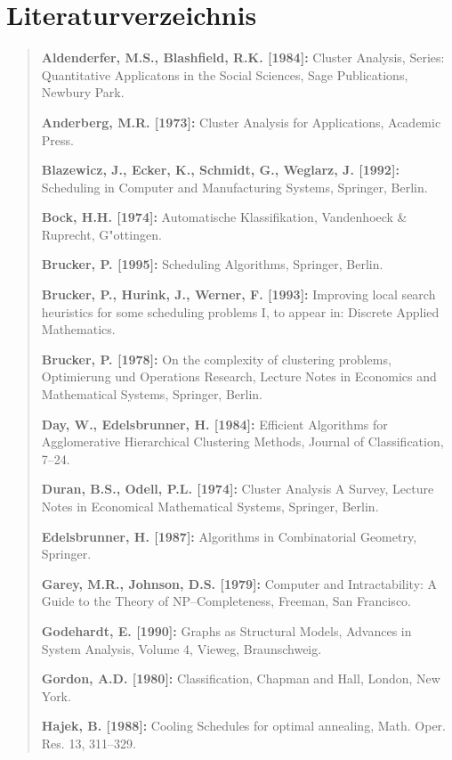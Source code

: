 \chapter*{Literaturverzeichnis}

\begin{sloppy}
\begin{verse}
{\bf Aldenderfer, M.S., Blashfield, R.K. [1984]:} Cluster Analysis,
	Series: Quantitative Applicatons in the Social Sciences, 
	Sage Publications, Newbury Park.

{\bf Anderberg, M.R. [1973]:} Cluster Analysis for Applications, 
	Academic Press.

{\bf Blazewicz, J., Ecker, K., Schmidt, G., Weglarz, J. [1992]:}
	Sche\-du\-ling in Computer and Manufacturing Systems, Springer, Berlin.

{\bf Bock, H.H. [1974]:} Automatische Klassifikation, Vandenhoeck \& 
	Rup\-recht, G"ot\-tin\-gen.

{\bf Brucker, P. [1995]:} Scheduling Algorithms, Springer, Berlin.

{\bf Brucker, P., Hurink, J., Werner, F. [1993]:} Improving local search
	heuristics for some scheduling problems I, to appear in:
	Discrete Applied Mathematics.

{\bf Brucker, P. [1978]:} On the complexity of clustering problems,
	Optimierung und Operations Research, Lecture Notes in
	Economics and Mathematical Systems, Springer, Berlin.

{\bf Day, W., Edelsbrunner, H. [1984]:} Efficient Algorithms for
	Agglomerative Hie\-rar\-chi\-cal Clustering Methods, Journal of
	Classification, 7--24.

{\bf Duran, B.S., Odell, P.L. [1974]:} Cluster Analysis A Survey, 
	Lecture Notes in Economical Mathematical Systems, Springer, Berlin.

{\bf Edelsbrunner, H. [1987]:} Algorithms in Combinatorial Geometry,
	Springer.

{\bf Garey, M.R., Johnson, D.S. [1979]:} Computer and Intractability:
	A Guide to the Theory of NP--Completeness, Freeman, San Francisco.

{\bf Godehardt, E. [1990]:} Graphs as Structural Models, Advances
	in System Analysis, Volume 4, Vieweg, Braunschweig.

{\bf Gordon, A.D. [1980]:} Classification, Chapman and Hall, London,
	New York.

{\bf Hajek, B. [1988]:} Cooling Schedules for optimal annealing, 
	Math. Oper. Res. 13, 311--329.


\end{verse}
\end{sloppy}
